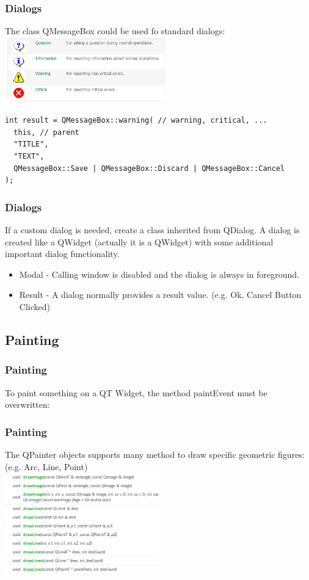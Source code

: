 \begin{frame}[fragile]
\frametitle{Dialogs}
The class QMessageBox could be used fo standard dialogs:
\vspace{3mm}
\includegraphics[width=200pt]{img/messagebox.png}
{\tiny
\begin{lstlisting}
int result = QMessageBox::warning( // warning, critical, ...
  this, // parent
  "TITLE",
  "TEXT",
  QMessageBox::Save | QMessageBox::Discard | QMessageBox::Cancel
);
\end{lstlisting}
}
\end{frame}

\begin{frame}[fragile]
\frametitle{Dialogs}
If a custom dialog is needed, create a class inherited from QDialog.
A dialog is created like a QWidget (actually it is a QWidget) with
some additional important dialog functionality.
\begin{itemize}
\item Modal - Calling window is disabled and the dialog is always in foreground.
\item Result - A dialog normally provides a result value.
(e.g. Ok, Cancel Button Clicked)
\end{itemize}
\end{frame}


\subsection{Painting}
\begin{frame}[fragile]
\frametitle{Painting}
To paint something on a QT Widget, the method paintEvent must be overwritten:

\end{frame}

\begin{frame}[fragile]
\frametitle{Painting}
The QPainter objects supports many method to draw specific geometric figures:
	(e.g. Arc, Line, Point)\\
	\vspace{3mm}
        \includegraphics[width=190pt]{img/painter.png}
\end{frame}


